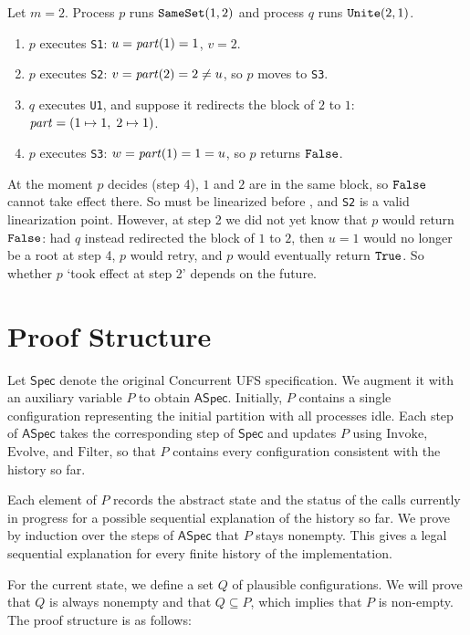\documentclass[12pt]{amsproc}
\begin{document}
Let $m = 2$. Process $p$ runs $\texttt{SameSet}{}(1,2)$ and process $q$ runs $\texttt{Unite}{}(2,1)$.
\begin{enumerate}
    \item $p$ executes \texttt{S1}: $u = \mathit{part}(1) = 1$, $v = 2$.
    \item $p$ executes \texttt{S2}: $v = \mathit{part}(2) = 2 \neq u$, so $p$ moves to \texttt{S3}.
    \item $q$ executes \texttt{U1}, and suppose it redirects the block of $2$ to $1$: $\mathit{part} = (1 \mapsto 1, \; 2 \mapsto 1)$.
    \item $p$ executes \texttt{S3}: $w = \mathit{part}(1) = 1 = u$, so $p$ returns $\texttt{False{}}{}$.
\end{enumerate}
At the moment $p$ decides (step 4), $1$ and $2$ are in the same block, so $\texttt{False{}}{}$ cannot take effect there. So \SameSet{} must be linearized before \Unite{}, and \texttt{S2} is a valid linearization point. However, at step 2 we did not yet know that $p$ would return $\texttt{False{}}{}$: had $q$ instead redirected the block of $1$ to $2$, then $u = 1$ would no longer be a root at step 4, $p$ would retry, and $p$ would eventually return $\texttt{True{}}{}$. So whether $p$ `took effect at step 2' depends on the future.

\newpage 

\section{Proof Structure}


Let $\mathsf{Spec}$ denote the original Concurrent UFS specification. We augment it with an auxiliary variable $P$ to obtain $\mathsf{ASpec}$. Initially, $P$ contains a single configuration representing the initial partition with all processes idle. Each step of $\mathsf{ASpec}$ takes the corresponding step of $\mathsf{Spec}$ and updates $P$ using $\mathrm{Invoke}$, $\mathrm{Evolve}$, and $\mathrm{Filter}$, so that $P$ contains every configuration consistent with the history so far.


Each element of $P$ records the abstract state and the status of the calls currently in progress for a possible sequential explanation of the history so far. We prove by induction over the steps of $\mathsf{ASpec}$ that $P$ stays nonempty. This gives a legal sequential explanation for every finite history of the implementation.

For the current state, we define a set $Q$ of plausible configurations. We will prove that $Q$ is always nonempty and that $Q \subseteq P$, which implies that $P$ is non-empty. The proof structure is as follows: 
\end{document}
